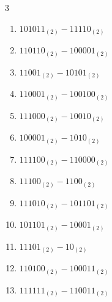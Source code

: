 \begin{multicols}{3}
\begin{enumerate}
\columnbreak %

\resetques

  \item $101011_{(2)} - 11110_{(2)}$


  \item $110110_{(2)} - 100001_{(2)}$


  \item $11001_{(2)} - 10101_{(2)}$


  \item $110001_{(2)} - 100100_{(2)}$


  \item $111000_{(2)} - 10010_{(2)}$


  \item $100001_{(2)} - 1010_{(2)}$


  \item $111100_{(2)} - 110000_{(2)}$


  \item $11100_{(2)} - 1100_{(2)}$


  \item $111010_{(2)} - 101101_{(2)}$


  \item $101101_{(2)} - 10001_{(2)}$


\columnbreak %

  \item $11101_{(2)} - 10_{(2)}$


  \item $110100_{(2)} - 100011_{(2)}$


  \item $111111_{(2)} - 110011_{(2)}$



\end{enumerate}
\end{multicols}
